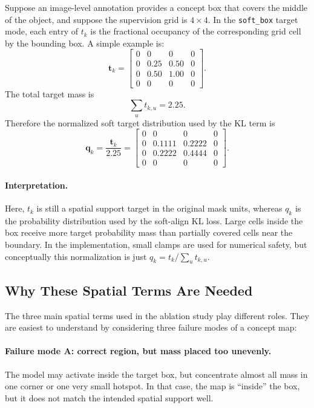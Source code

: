 \documentclass[11pt]{article}
\begin{document}
Suppose an image-level annotation provides a concept box that covers the middle
of the object, and suppose the supervision grid is $4 \times 4$. In the
\texttt{soft\_box} target mode, each entry of $t_k$ is the fractional occupancy
of the corresponding grid cell by the bounding box. A simple example is:
\[
\mathbf{t}_k
=
\begin{bmatrix}
0 & 0 & 0 & 0 \\
0 & 0.25 & 0.50 & 0 \\
0 & 0.50 & 1.00 & 0 \\
0 & 0 & 0 & 0
\end{bmatrix}.
\]
The total target mass is
\[
\sum_u t_{k,u} = 2.25.
\]
Therefore the normalized soft target distribution used by the KL term is
\[
\mathbf{q}_k
=
\frac{\mathbf{t}_k}{2.25}
=
\begin{bmatrix}
0 & 0 & 0 & 0 \\
0 & 0.1111 & 0.2222 & 0 \\
0 & 0.2222 & 0.4444 & 0 \\
0 & 0 & 0 & 0
\end{bmatrix}.
\]

\paragraph{Interpretation.}
Here, $t_k$ is still a spatial support target in the original mask units,
whereas $q_k$ is the probability distribution used by the soft-align KL loss.
Large cells inside the box receive more target probability mass than partially
covered cells near the boundary. In the implementation, small clamps are used
for numerical safety, but conceptually this normalization is just
$q_k = t_k / \sum_u t_{k,u}$.

\subsection{Why These Spatial Terms Are Needed}
The three main spatial terms used in the ablation study play different roles.
They are easiest to understand by considering three failure modes of a concept
map:

\paragraph{Failure mode A: correct region, but mass placed too unevenly.}
The model may activate inside the target box, but concentrate almost all mass in
one corner or one very small hotspot. In that case, the map is ``inside'' the
box, but it does not match the intended spatial support well.
\end{document}
